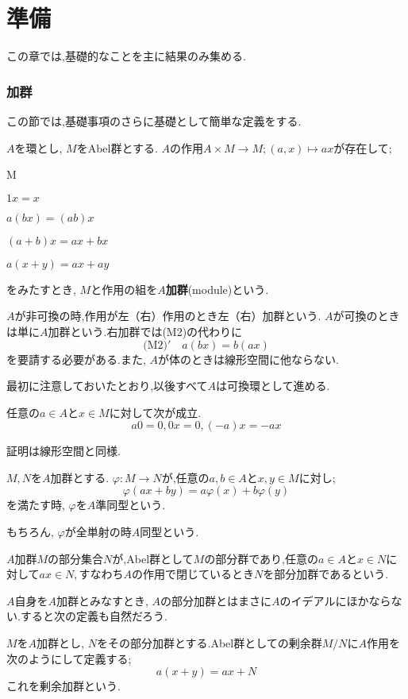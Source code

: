 \part[Preliminaries]{準備}
この章では,基礎的なことを主に結果のみ集める.
\section{加群}

この節では,基礎事項のさらに基礎として簡単な定義をする.
\begin{defi}[加群]
	$A$を環とし, $M$をAbel群とする. $A$の作用$A\times M\to M;(a,x)\mapsto ax$が存在して;
	\begin{defiterm}{M}
		\item $1x=x$
		\item $a(bx)=(ab)x$
		\item $(a+b)x=ax+bx$
		\item $a(x+y)=ax+ay$
	\end{defiterm}
	をみたすとき, $M$と作用の組を$A$\textbf{加群}(module)という.
\end{defi}

$A$が非可換の時,作用が左（右）作用のとき左（右）加群という. $A$が可換のときは単に$A$加群という.右加群では(M2)の代わりに
\[\textrm{(M2)}'\quad a(bx)=b(ax)\]
を要請する必要がある.また, $A$が体のときは線形空間に他ならない.

最初に注意しておいたとおり,以後すべて$A$は可換環として進める.
\begin{prop}
	任意の$a\in A$と$x\in M$に対して次が成立.
	\[a0=0,0x=0,(-a)x=-ax\]
\end{prop}

証明は線形空間と同様.

\begin{defi}[準同型]
	$M,N$を$A$加群とする. $\varphi:M\to N$が,任意の$a,b\in A$と$x,y\in M$に対し;
	\[\varphi(ax+by)=a\varphi(x)+b\varphi(y)\]
	を満たす時, $\varphi$を$A$準同型という.
\end{defi}

もちろん, $\varphi$が全単射の時$A$同型という.

\begin{defi}[部分加群]
	$A$加群$M$の部分集合$N$が,Abel群として$M$の部分群であり,任意の$a\in A$と$x\in N$に対して$ax\in N, $すなわち$A$の作用で閉じているとき$N$を部分加群であるという.
\end{defi}

$A$自身を$A$加群とみなすとき, $A$の部分加群とはまさに$A$のイデアルにほかならない.すると次の定義も自然だろう.
\begin{defi}[剰余加群]
	$M$を$A$加群とし, $N$をその部分加群とする.Abel群としての剰余群$M/N$に$A$作用を次のようにして定義する;
	\[a(x+y)=ax+N\]
	これを剰余加群という.
\end{defi}

